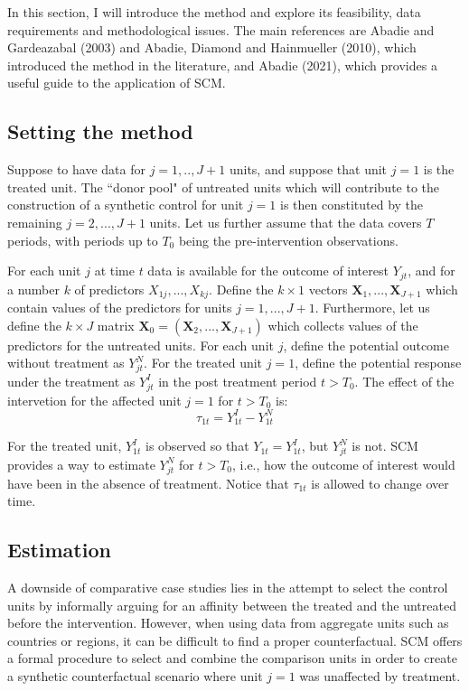 \documentclass[12pt,a4paper,draft]{article}
\begin{document}
In this section, I will introduce the method and explore its feasibility, 
data requirements and methodological issues. 
The main references are Abadie and Gardeazabal (2003) and Abadie, Diamond and 
Hainmueller (2010), which introduced the method in the literature, and Abadie 
(2021), which provides a useful guide to the application of SCM.


\subsection{Setting the method}

Suppose to have data for $j=1,..,J+1$ units, and suppose that unit $j=1$ is the 
treated unit. The ``donor pool" of untreated units which will contribute to the 
construction of a synthetic control for unit $j=1$ is then constituted by the 
remaining $j=2,...,J+1$ units.
Let us further assume that the data covers $T$ periods, with periods up to 
$T_0$ being the pre-intervention observations.

For each unit $j$ at time $t$ data is available for the outcome of interest 
$Y_{jt}$, and for a number $k$ of predictors $X_{1j}, ..., X_{kj}$. Define the 
$k \times 1$ vectors $\mathbf{X}_1, ..., \mathbf{X}_{J+1}$ which contain values
of the predictors for units $j=1,...,J+1$. Furthermore, let us define the $k \times J$ matrix 
$\mathbf{X}_0= \left(\mathbf{X}_2,..., \mathbf{X}_{J+1}\right)$ which collects values of the predictors 
for the untreated units.
For each unit $j$, define the potential outcome without treatment as $Y_{jt}^N$.
For the treated unit $j=1$, define the potential response under the treatment as 
$Y_{jt}^I$ in the post treatment period $t>T_0$. 
The effect of the intervetion for the affected unit $j=1$ for $t>T_0$ is: 
\begin{equation}
\tau_{1t}=Y_{1t}^I-Y_{1t}^N
\end{equation}

For the treated unit, $Y_{1t}^I$ is observed so that  $Y_{1t}=Y_{1t}^I$, but $Y_{jt}^N$ is not. 
SCM provides a way to estimate $Y_{jt}^N$ for $t>T_0$, i.e., how the outcome 
of interest would have been in the absence of treatment. 
Notice that $\tau_{1t}$ is allowed to change over time.



\subsection{Estimation} 

A downside of comparative case studies lies in the attempt to select the control 
units by informally arguing for an affinity between the treated and the untreated 
before the intervention. However, when using data from aggregate units such as 
countries or regions, it can be difficult to find a proper counterfactual.
SCM offers a formal procedure to select and combine the comparison units in order
to create a synthetic counterfactual scenario where unit $j=1$ was unaffected by treatment.
\end{document}
